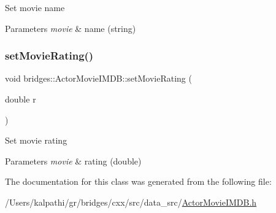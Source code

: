 Set movie name


\begin{DoxyParams}{Parameters}
{\em movie} & name (string) \\
\hline
\end{DoxyParams}
\mbox{\label{classbridges_1_1_actor_movie_i_m_d_b_aea16db5315526ff31a1685c08390cdc7}} 
\subsubsection{\texorpdfstring{setMovieRating()}{setMovieRating()}}
{\footnotesize\ttfamily void bridges\+::\+Actor\+Movie\+I\+M\+D\+B\+::set\+Movie\+Rating (\begin{DoxyParamCaption}\item[{double}]{r }\end{DoxyParamCaption})\hspace{0.3cm}{\ttfamily [inline]}}

Set movie rating


\begin{DoxyParams}{Parameters}
{\em movie} & rating (double) \\
\hline
\end{DoxyParams}


The documentation for this class was generated from the following file\+:\begin{DoxyCompactItemize}
\item 
/\+Users/kalpathi/gr/bridges/cxx/src/data\+\_\+src/\mbox{\hyperlink{_actor_movie_i_m_d_b_8h}{Actor\+Movie\+I\+M\+D\+B.\+h}}\end{DoxyCompactItemize}
